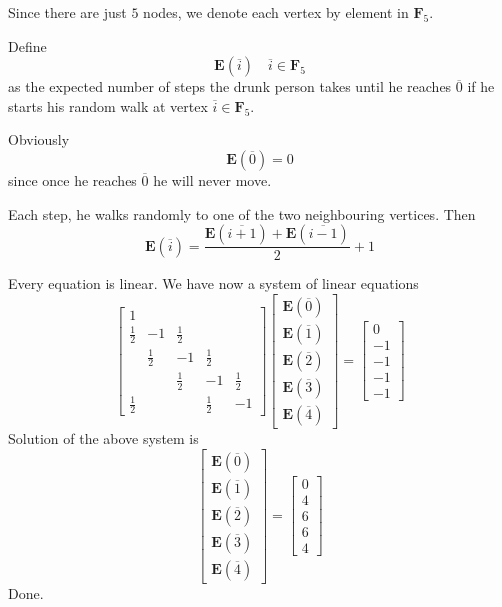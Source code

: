 Since there are just $5$ nodes, we denote each vertex by element in $\mathbf{F}_5$.

Define
\[
	\mathbf{E}(\overline{i})\quad\overline{i}\in\mathbf{F}_5
\]
as the expected number of steps the drunk person takes until he reaches $\overline{0}$ if he starts his random walk at vertex $\overline{i}\in\mathbf{F}_5$.

Obviously
\[
	\mathbf{E}(\overline{0})=0
\]
since once he reaches $\overline{0}$ he will never move.

Each step, he walks randomly to one of the two neighbouring vertices. Then
\[
	\mathbf{E}(\overline{i})=\frac{\mathbf{E}(\overline{i+1})+\mathbf{E}(\overline{i-1})}{2}+1
\]

Every equation is linear. We have now a system of linear equations
\[
	\begin{bmatrix}
		1 & & & & \\
		\frac{1}{2} & -1 & \frac{1}{2} & & \\
		 & \frac{1}{2} & -1 & \frac{1}{2} & \\
		 & & \frac{1}{2} & -1 & \frac{1}{2} \\
		\frac{1}{2} & & & \frac{1}{2} & -1
	\end{bmatrix}
	\begin{bmatrix}
		\mathbf{E}(\overline{0}) \\
		\mathbf{E}(\overline{1}) \\
		\mathbf{E}(\overline{2}) \\
		\mathbf{E}(\overline{3}) \\
		\mathbf{E}(\overline{4})
	\end{bmatrix}
	=
	\begin{bmatrix}
		0 \\
		-1 \\
		-1 \\
		-1 \\
		-1
	\end{bmatrix}
\]
Solution of the above system is
\[
	\begin{bmatrix}
		\mathbf{E}(\overline{0}) \\
		\mathbf{E}(\overline{1}) \\
		\mathbf{E}(\overline{2}) \\
		\mathbf{E}(\overline{3}) \\
		\mathbf{E}(\overline{4})
	\end{bmatrix}
	=
	\begin{bmatrix}
		0 \\
		4 \\
		6 \\
		6 \\
		4
	\end{bmatrix}
\]
Done.